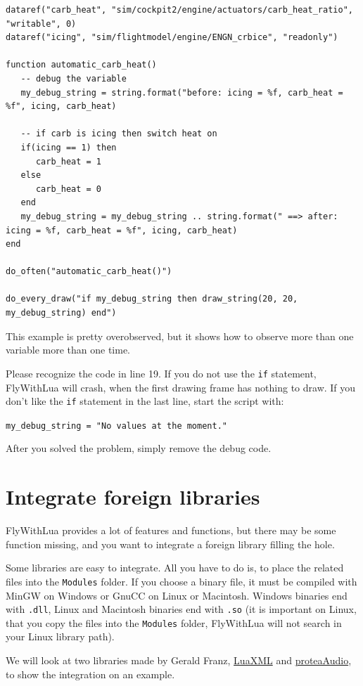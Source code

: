 \documentclass[11pt,parskip=half,a4paper]{scrartcl}
\begin{document}
\begin{lstlisting}
dataref("carb_heat", "sim/cockpit2/engine/actuators/carb_heat_ratio", "writable", 0)
dataref("icing", "sim/flightmodel/engine/ENGN_crbice", "readonly")

function automatic_carb_heat()
   -- debug the variable
   my_debug_string = string.format("before: icing = %f, carb_heat = %f", icing, carb_heat)

   -- if carb is icing then switch heat on 
   if(icing == 1) then
      carb_heat = 1
   else
      carb_heat = 0
   end	
   my_debug_string = my_debug_string .. string.format(" ==> after: icing = %f, carb_heat = %f", icing, carb_heat)
end

do_often("automatic_carb_heat()")

do_every_draw("if my_debug_string then draw_string(20, 20, my_debug_string) end")\end{lstlisting}

This example is pretty overobserved, but it shows how to observe more than one variable more than one time.

Please recognize the code in line 19. If you do not use the \verb|if| statement, FlyWithLua will crash, when the first drawing frame has nothing to draw. If you don't like the \verb|if| statement in the last line, start the script with:

\verb|my_debug_string = "No values at the moment."|

After you solved the problem, simply remove the debug code.

\section{Integrate foreign libraries}

FlyWithLua provides a lot of features and functions, but there may be some function missing, and you want to integrate a foreign library filling the hole.

Some libraries are easy to integrate. All you have to do is, to place the related files into the \verb|Modules| folder. If you choose a binary file, it must be compiled with MinGW on Windows or GnuCC on Linux or Macintosh. Windows binaries end with \verb|.dll|, Linux and Macintosh binaries end with \verb|.so| (it is important on Linux, that you copy the files into the \verb|Modules| folder, FlyWithLua will not search in your Linux library path).

We will look at two libraries made by Gerald Franz, \href{http://viremo.eludi.net/LuaXML/index.html}{LuaXML} and \href{http://viremo.eludi.net/proteaAudio/proteaaudiolua.html}{proteaAudio}, to show the integration on an example.
\end{document}
